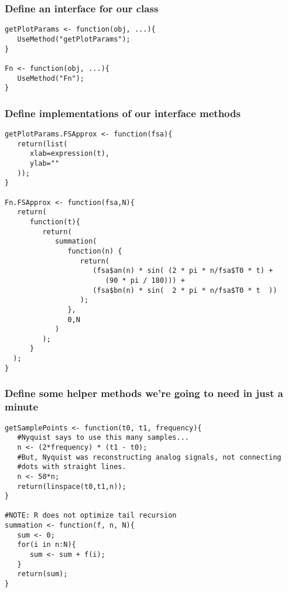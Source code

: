 \documentclass{beamer}
\begin{document}
\begin{frame}[fragile]
   \frametitle{Define an interface for our class}
   \begin{center}
   \begin{minipage}{100mm}
   \begin{lstlisting}
getPlotParams <- function(obj, ...){
   UseMethod("getPlotParams");
}

Fn <- function(obj, ...){
   UseMethod("Fn");
}
   \end{lstlisting}
   \end{minipage}
   \end{center}
\end{frame}

\begin{frame}[fragile]
   \frametitle{Define implementations of our interface methods}
   \begin{center}
   \begin{minipage}{100mm}
   \begin{lstlisting}
getPlotParams.FSApprox <- function(fsa){
   return(list(
      xlab=expression(t),
      ylab=""
   ));
}

Fn.FSApprox <- function(fsa,N){
   return(
      function(t){
         return(
            summation(
               function(n) {
                  return(
                     (fsa$an(n) * sin( (2 * pi * n/fsa$T0 * t) + 
                        (90 * pi / 180))) +
                     (fsa$bn(n) * sin(  2 * pi * n/fsa$T0 * t  )) 
                  );
               }, 
               0,N
            )
         );
      }
  );
}
   \end{lstlisting}
   \end{minipage}
   \end{center}
\end{frame}

\begin{frame}[fragile]
   \frametitle{Define some helper methods we're going to need in just a minute}
   \begin{center}
   \begin{minipage}{100mm}
   \begin{lstlisting}
getSamplePoints <- function(t0, t1, frequency){
   #Nyquist says to use this many samples...
   n <- (2*frequency) * (t1 - t0);
   #But, Nyquist was reconstructing analog signals, not connecting 
   #dots with straight lines.
   n <- 50*n;
   return(linspace(t0,t1,n));
}

#NOTE: R does not optimize tail recursion
summation <- function(f, n, N){
   sum <- 0;
   for(i in n:N){
      sum <- sum + f(i);
   }
   return(sum);
}
   \end{lstlisting}
   \end{minipage}
   \end{center}
\end{frame}
\end{document}
